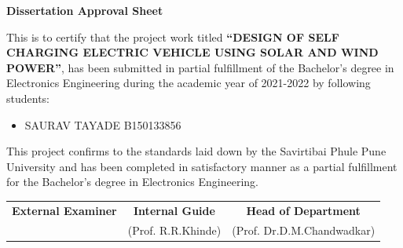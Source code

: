 \documentclass[a4paper,12pt]{article}
\begin{document}
\newpage
\thispagestyle{empty}
\begin{center}
\Large\textbf{Dissertation Approval Sheet}\\[1cm]
\end{center}
\large This is to certify that the project work titled \textbf{“DESIGN OF SELF CHARGING ELECTRIC VEHICLE USING SOLAR AND WIND POWER”}, has been submitted in partial fulfillment of the Bachelor’s degree in Electronics Engineering during the academic year of 2021-2022 by following students:\\[2cm]
\begin{itemize}
\item SAURAV TAYADE {B150133856}\\[2cm]

\end{itemize}
\large This project confirms to the standards laid down by the Savirtibai Phule Pune University and has been completed in satisfactory manner as a partial fulfillment for the Bachelor’s degree in Electronics Engineering.\\[2in]
\begin{tabular}{c c c}
\textbf{External Examiner} & \hspace{0.15cm} \textbf{Internal Guide} & \hspace{0.15cm} \textbf{Head of Department}\\

               & \hspace{0.9cm}(Prof. R.R.Khinde)  & \hspace{1cm}(Prof. Dr.D.M.Chandwadkar)\\
\end{tabular}\\

\end{document}
